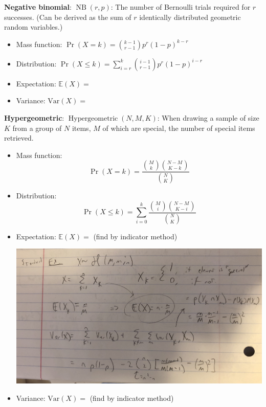 \documentclass{article}
\newcommand{\E}{\mathbb{E}}
\newcommand{\Var}{\mathrm{Var}}
\begin{document}
\textbf{Negative binomial}: \( \operatorname{NB}(r, p)\): The number of Bernoulli trials required for \(r\) successes. (Can be derived as the sum of \(r\) identically distributed geometric random variables.)

\begin{itemize}

\item Mass function: \(\Pr(X = k) =  \binom{k-1}{r-1} p^r (1-p)^{k-r}\)

\item Distribution: \(\Pr(X \leq k) = \sum_{i=r}^k \binom{i-1}{r-1} p^r (1-p)^{i-r} \)

\item Expectation: \(\E(X) = \)

\item Variance: \(\Var(X) = \)

\end{itemize}


\textbf{Hypergeometric}: \( \operatorname{Hypergeometric}(N, M, K)\): When drawing a sample of size \(K\) from a group of \(N\) items, \(M\) of which are special, the number of special items retrieved.

\begin{itemize}

\item Mass function: \[\Pr(X = k) = \frac{\binom{M}{k} \binom{N-M}{K-k}}{\binom{N}{K}} \]

\item Distribution: \[\Pr(X \leq k) = \sum_{i=0}^k \frac{\binom{M}{i} \binom{N-M}{K-i}}{\binom{N}{K}}  \]

\item Expectation: \(\E(X) = \) (find by indicator method)

\includegraphics[scale=0.1]{prob_hypergeometric}

\item Variance: \(\Var(X) = \) (find by indicator method)

\end{itemize}
\end{document}
